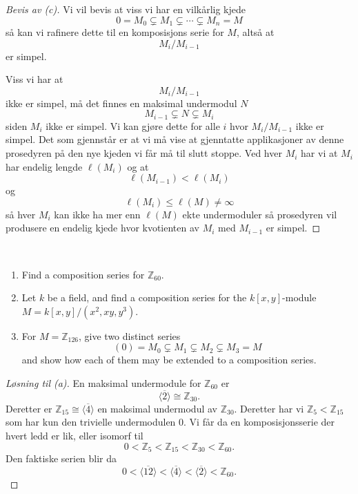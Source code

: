 \begin{proof}[Bevis av (c)]
    Vi vil bevis at viss vi har en vilkårlig kjede 
    \[
        0 = M_0 \subsetneq M_1 \subsetneq \cdots 
        \subsetneq M_n = M 
    \]
    så kan vi rafinere dette til en komposisjons serie 
    for $M$, altså at 
    \[
        M_i/M_{i-1}
    \]
    er simpel. 

    Viss vi har at 
    \[
        M_i/M_{i-1}
    \]
    ikke er simpel, må det finnes en 
    maksimal undermodul $N$ 
    \[
        M_{i-1} \subsetneq N \subsetneq M_i 
    \]
    siden $M_i$ ikke er simpel. 
    Vi kan gjøre dette for alle $i$ hvor $M_i/M_{i-1}$
    ikke er simpel. Det som gjennstår er at 
    vi må vise at gjenntatte applikasjoner av denne prosedyren 
    på den nye kjeden vi får må til slutt stoppe. 
    Ved hver $M_i$ har vi at $M_i$ har endelig lengde 
    $\ell(M_i)$ og at 
    \[
        \ell(M_{i-1}) < \ell(M_i) 
    \]
    og 
    \[
        \ell(M_i) \leq \ell(M) \neq \infty 
    \]
    så hver $M_i$ kan ikke ha mer enn $\ell(M)$ 
    ekte undermoduler så prosedyren vil produsere 
    en endelig kjede hvor kvotienten av $M_i$ med $M_{i-1}$
    er simpel. 
\end{proof}

\begin{prob*}[2]
    \medskip 
    \   
    
    \begin{enumerate}[label=\alph*)]
        \item Find a composition series for 
            $\mathbb Z_{60}$. 
        \item Let $k$ be a field, and find a composition 
        series for the $k[x,y]$-module $M = k[x,y]/(x^2,xy,y^3)$.
        \item For $M = \mathbb Z_{126}$, give two distinct 
        series 
        \[
            (0) = M_0 \subsetneq M_1 \subsetneq M_2 \subsetneq M_3 = M
        \] 
        and show how each of them may be extended to a composition series.
    \end{enumerate}
\end{prob*}
\begin{proof}[Løsning til (a)]
    En maksimal undermodule for $\mathbb Z_{60}$ er 
    \[
        \langle \overline 2 \rangle \cong \mathbb Z_{30}. 
    \]
    Deretter er $\mathbb Z_{15} \cong 
    \langle \overline 4 \rangle$ en maksimal undermodul 
    av $\mathbb Z_{30}$. Deretter har vi $\mathbb Z_5 < 
    \mathbb Z_{15}$ som har kun den trivielle undermodulen 
    $0$. 
    Vi får da en komposisjonsserie der hvert ledd 
    er lik, eller isomorf til 
    \[
        0 < \mathbb Z_5 < \mathbb Z_{15} < \mathbb Z_{30}
        < \mathbb Z_{60}.
    \]
    Den faktiske serien blir da 
    \[
        0 < \langle \overline{12} \rangle 
        < \langle \overline 4 \rangle 
        < \langle \overline 2 \rangle 
        < \mathbb Z_{60}. 
    \]
\end{proof}

